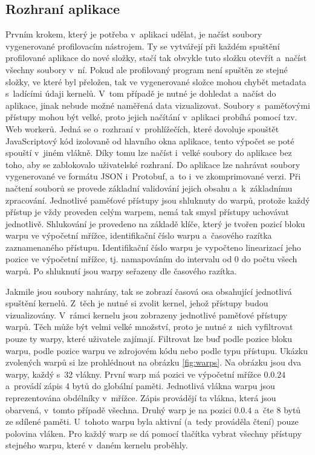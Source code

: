 \subsection{Rozhraní aplikace}
Prvním krokem, který je potřeba v~aplikaci udělat, je načíst soubory vygenerované profilovacím nástrojem. Ty se vytvářejí při každém spuštění profilované aplikace do nové složky, stačí tak obvykle tuto složku otevřít a~načíst všechny soubory v~ní. Pokud ale profilovaný program není spuštěn ze stejné složky, ve které byl přeložen, tak ve vygenerované složce mohou chybět metadata s~ladícími údaji kernelů. V~tom případě je nutné je dohledat a~načíst do aplikace, jinak nebude možné naměřená data vizualizovat. Soubory s~paměťovými přístupy mohou být velké, proto jejich načítání v~aplikaci probíhá pomocí tzv. Web workerů. Jedná se o~rozhraní v~prohlížečích, které dovoluje spouštět JavaScriptový kód izolovaně od hlavního okna aplikace, tento výpočet se poté spouští v~jiném vlákně. Díky tomu lze načíst i~velké soubory do aplikace bez toho, aby se zablokovalo uživatelské rozhraní. Do aplikace lze nahrávat soubory vygenerované ve formátu JSON i~Protobuf, a~to i~ve zkomprimované verzi. Při načtení souborů se provede základní validování jejich obsahu a~k~základnímu zpracování. Jednotlivé paměťové přístupy jsou shluknuty do warpů, protože každý přístup je vždy proveden celým warpem, nemá tak smysl přístupy uchovávat jednotlivě. Shlukování je provedeno na základě klíče, který je tvořen pozicí bloku warpu ve výpočetní mřížce, identifikační číslo warpu a~časového razítka zaznamenaného přístupu. Identifikační číslo warpu je vypočteno linearizací jeho pozice ve výpočetní mřížce, tj. namapováním do intervalu od 0 do počtu všech warpů. Po shluknutí jsou warpy seřazeny dle časového razítka. 

Jakmile jsou soubory nahrány, tak se zobrazí časová osa obsahující jednotlivá spuštění kernelů. Z~těch je nutné si zvolit kernel, jehož přístupy budou vizualizovány. V~rámci kernelu jsou zobrazeny jednotlivé paměťové přístupy warpů. Těch může být velmi velké množství, proto je nutné z~nich vyfiltrovat pouze ty warpy, které uživatele zajímají. Filtrovat lze buď podle pozice bloku warpu, podle pozice warpu ve zdrojovém kódu nebo podle typu přístupu. Ukázku zvolených warpů si lze prohlédnout na obrázku \ref{fig:warps}.
Na obrázku jsou dva warpy, každý s~32 vlákny. První warp má pozici ve výpočetní mřížce $0.0.24$ a~provádí zápis 4 bytů do globální paměti. Jednotlivá vlákna warpu jsou reprezentována obdélníky v~mřížce. Zápis provádějí ta vlákna, která jsou obarvená, v~tomto případě všechna. Druhý warp je na pozici $0.0.4$ a~čte 8 bytů ze sdílené paměti. U~tohoto warpu byla aktivní (a~tedy prováděla čtení) pouze polovina vláken. Pro každý warp se dá pomocí tlačítka vybrat všechny přístupy stejného warpu, které v~daném kernelu proběhly.

